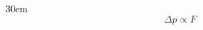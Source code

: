 \documentclass[border=4pt]{standalone}
\begin{document}
\begin{varwidth}{30em}
\large
\[ \Delta p \propto F \]

\end{varwidth}
\end{document}
